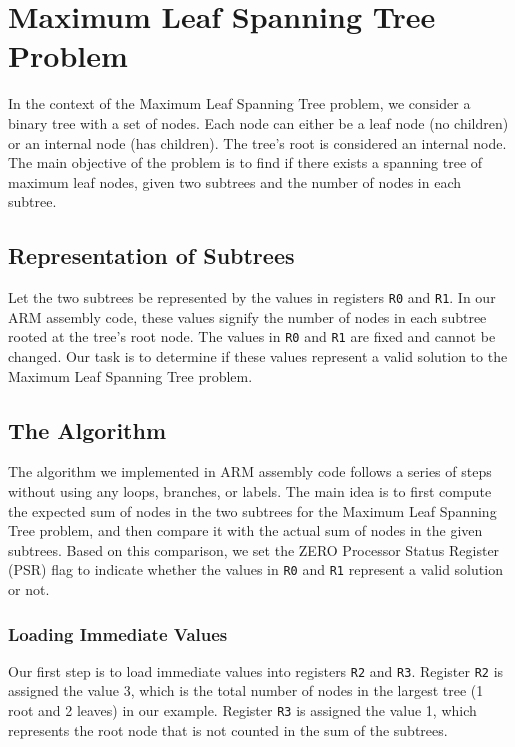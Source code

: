 \section{Maximum Leaf Spanning Tree Problem}

In the context of the Maximum Leaf Spanning Tree problem, we consider a binary tree with a set of nodes. Each node can either be a leaf node (no children) or an internal node (has children). The tree's root is considered an internal node. The main objective of the problem is to find if there exists a spanning tree of maximum leaf nodes, given two subtrees and the number of nodes in each subtree.

\subsection{Representation of Subtrees}

Let the two subtrees be represented by the values in registers \texttt{R0} and \texttt{R1}. In our ARM assembly code, these values signify the number of nodes in each subtree rooted at the tree's root node. The values in \texttt{R0} and \texttt{R1} are fixed and cannot be changed. Our task is to determine if these values represent a valid solution to the Maximum Leaf Spanning Tree problem.

\subsection{The Algorithm}

The algorithm we implemented in ARM assembly code follows a series of steps without using any loops, branches, or labels. The main idea is to first compute the expected sum of nodes in the two subtrees for the Maximum Leaf Spanning Tree problem, and then compare it with the actual sum of nodes in the given subtrees. Based on this comparison, we set the ZERO Processor Status Register (PSR) flag to indicate whether the values in \texttt{R0} and \texttt{R1} represent a valid solution or not.

\subsubsection{Loading Immediate Values}

Our first step is to load immediate values into registers \texttt{R2} and \texttt{R3}. Register \texttt{R2} is assigned the value 3, which is the total number of nodes in the largest tree (1 root and 2 leaves) in our example. Register \texttt{R3} is assigned the value 1, which represents the root node that is not counted in the sum of the subtrees.

